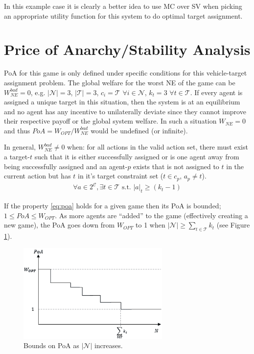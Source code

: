 \documentclass[defaultstyle,12pt]{proposal}
\def\Pl{\mathcal{N}}  %
\def\Ta{\mathcal{T}}  %
\def\Co{\mathcal{C}}  %
\begin{document}
In this example case it is clearly a better idea to use MC over SV when picking an appropriate utility function for this system to do optimal target assignment.

\section{Price of Anarchy/Stability Analysis}\label{sec:poapos}
PoA for this game is only defined under specific conditions for this vehicle-target assignment problem. The global welfare for the worst NE of the game can be $W_{NE}^{bad} = 0$, e.g. $|\Pl| = 3$, $|\Ta| = 3$, $c_i = \Ta$ $\forall i \in \Pl$, $k_t = 3$ $\forall t \in \Ta$. If every agent is assigned a unique target in this situation, then the system is at an equilibrium and no agent has any incentive to unilaterally deviate since they cannot improve their respective payoff or the global system welfare. In such a situation $W_{NE} = 0$ and thus $PoA = W_{OPT} / W_{NE}^{bad}$ would be undefined (or infinite).

In general, $W_{NE}^{bad} \not= 0$ when: for all actions in the valid action set, there must exist a target-$t$ such that it is either successfully assigned or is one agent away from being successfully assigned and an agent-$p$ exists that is not assigned to $t$ in the current action but has $t$ in it's target constraint set ($t \in c_p$, $a_p \not= t$).
\begin{align}
	\forall a \in 2^\Co, \exists t \in \Ta \text{ s.t. } |a|_t \geq (k_t - 1)\label{eq:poa}
\end{align}

If the property \eqref{eq:poa} holds for a given game then its PoA is bounded; $1 \leq PoA \leq W_{OPT}$. As more agents are ``added'' to the game (effectively creating a new game), the PoA goes down from $W_{OPT}$ to 1 when $|\Pl| \geq \sum\limits_{t \in \Ta} k_t$ (see Figure \ref{fig:poa}).

\begin{figure}[!htb]
	\centering\includegraphics[width=7.5cm]{../assets/poa.png}
	\centering\caption{Bounds on PoA as $|\Pl|$ increases.}\label{fig:poa}
\end{figure}
\end{document}
